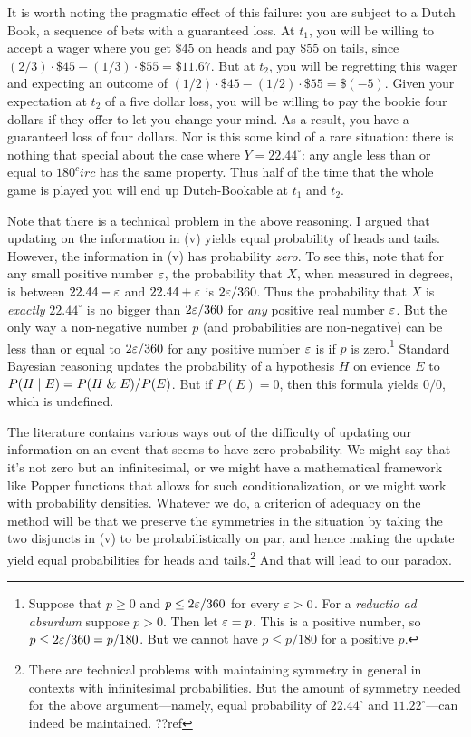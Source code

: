 It is worth noting the pragmatic effect of this failure: you are subject to a Dutch Book, a sequence of bets with a guaranteed
loss. At $t_1$, you will be willing to accept a wager where you get $\$45$ on heads and pay $\$55$ on tails, since
$(2/3)\cdot \$45 - (1/3)\cdot \$55 = \$11.67$. But at $t_2$, you will be regretting this wager and expecting an outcome of
$(1/2)\cdot \$45 - (1/2)\cdot \$55 = \$(-5)$. Given your expectation at $t_2$ of a five dollar loss, you will be willing to pay the 
bookie four dollars if they offer to let you change your mind. As a result, you have a guaranteed loss of four dollars.  
Nor is this some kind of a rare situation: there is nothing that special about the case where $Y=22.44^\circ$: any angle
less than or equal to $180^circ$ has the same property. Thus half of the time that the whole game is played you will end up
Dutch-Bookable at $t_1$ and $t_2$.

Note that there is a technical problem in the above reasoning. I argued that updating on the information in (v) yields equal probability
of heads and tails. However, the information in (v) has probability \textit{zero}. To see this, note that for any small positive
number $\varepsilon$, the probability that $X$, when measured in degrees, is between $22.44-\varepsilon$ and $22.44+\varepsilon$ is $2\varepsilon / 360$. Thus the 
probability that $X$ is \textit{exactly} $22.44^\circ$ is no bigger than $2\varepsilon / 360$ for \textit{any} positive real number $\varepsilon$.
But the only way a non-negative number $p$ (and probabilities are non-negative) can be less than or equal to $2\varepsilon / 360$ for any positive
number $\varepsilon$ is if $p$ is zero.\footnote{Suppose that $p\ge 0$ and $p\le 2\varepsilon/360$ for 
every $\varepsilon>0$. For a \textit{reductio ad absurdum} suppose $p>0$. Then let $\varepsilon = p$. This is a positive number, so $p \le 2\varepsilon/360 = p/180$.
But we cannot have $p \le p/180$ for a positive $p$.} Standard Bayesian reasoning updates the probability of a hypothesis $H$ on evience $E$
to $P(H\mid E)=P(H\mathrel{\&} E)/P(E)$. But if $P(E)=0$, then this formula yields $0/0$, which is undefined. 

The literature contains various ways out of the difficulty of updating our information on an event that seems to have zero probability.
We might say that it's not zero but an infinitesimal, or we might have a mathematical framework like Popper functions that allows
for such conditionalization, or we might work with probability densities. Whatever we do, a criterion of adequacy on the method will be that we 
preserve the symmetries in the situation by taking the two disjuncts in (v) to be probabilistically on par, and hence making the 
update yield equal probabilities for heads and tails.\footnote{There are technical problems with maintaining symmetry in general in contexts with
infinitesimal probabilities. But the amount of symmetry needed for the above argument---namely, equal probability of $22.44^\circ$ and
$11.22^\circ$---can indeed be maintained. ??ref} And that will lead to our paradox.

